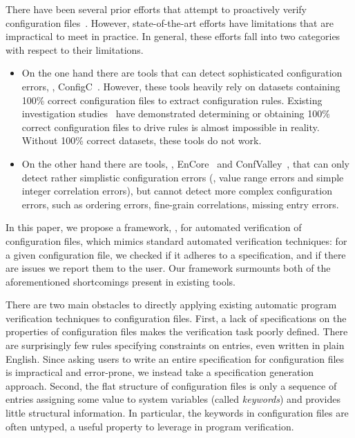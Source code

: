 There have been several prior efforts that attempt to proactively verify 
configuration files~\cite{santolucitoCAV, xu16early,
zhang14encore, huang15confvalley}.
However, state-of-the-art efforts have limitations that are impractical to meet in practice.
In general, these efforts fall into two categories with respect to their limitations.
\begin{itemize}
\item On the one hand there are tools that can detect sophisticated 
configuration errors, \eg, ConfigC~\cite{santolucitoCAV}. 
However, these tools heavily rely on datasets containing 100\% 
correct configuration files to extract configuration rules.
Existing investigation studies~\cite{wang04automatic, yin11anempirical}
have demonstrated determining or obtaining 100\% correct configuration
files to drive rules is almost impossible in reality. 
Without 100\% correct datasets, these tools do not work.
\item On the other hand there are tools, 
\eg, EnCore~\cite{zhang14encore} and
ConfValley~\cite{huang15confvalley}, that can only 
detect rather simplistic configuration errors (\eg, value range errors 
and simple integer correlation errors), but cannot detect
more complex configuration errors, such as ordering errors, fine-grain correlations, missing entry errors.
\end{itemize}

In this paper, we propose a framework, \app, for automated verification of 
configuration files, which mimics standard automated verification 
techniques: for a given configuration file, we  checked if it 
adheres to a specification, and if there are issues we report them to 
the user.
Our framework surmounts both of the aforementioned shortcomings present in existing tools. 

There are two main obstacles to directly applying existing automatic program
verification techniques to configuration files.
First, a lack of specifications on the properties of configuration files makes the verification task poorly defined.
There are surprisingly few rules specifying constraints on entries, even written in plain English.
Since asking users to write an entire specification for configuration files is impractical and error-prone, we instead take a specification generation approach.
Second, the flat structure of configuration files is only a sequence of entries assigning some value to system
variables (called {\emph {keywords}}) and provides little structural information.
In particular, the keywords in configuration files are often untyped, a useful property to leverage in program verification.

